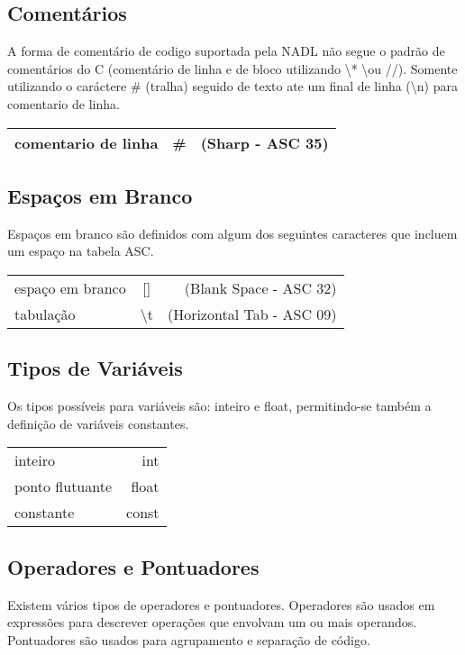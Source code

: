 \documentclass[a4paper,10pt]{article}
\begin{document}
	\subsection{Coment\'arios}
	A forma de coment\'ario de codigo suportada pela NADL n\~ao segue o padr\~ao de coment\'arios do C (coment\'ario de linha e de bloco utilizando \textbackslash * * \textbackslash  ou //). Somente utilizando o car\'actere \# (tralha) seguido de texto ate um final de linha (\textbackslash n) para comentario de linha.

	\begin{center}
	 \begin{tabular}{| l | c | r |}
	  \hline
	  comentario de linha & \# & (Sharp - ASC 35)\\
	  \hline
	 \end{tabular}
	\end{center}

	\subsection{Espa\c{c}os em Branco}
	Espa\c{c}os em branco s\~{a}o definidos com algum dos seguintes caracteres que incluem um espa\c{c}o na tabela ASC.
	\begin{center}
	 \begin{tabular}{| l | c | r |}
	  \hline
	  espa\c{c}o em branco & [] & (Blank Space - ASC 32) \\
	  tabula\c{c}\~{a}o & \textbackslash t & (Horizontal Tab - ASC 09) \\
	  \hline
	 \end{tabular}
	\end{center}

	\subsection{Tipos de Vari\'aveis}
	Os tipos poss\'iveis para vari\'aveis s\~ao: inteiro e float, permitindo-se tamb\'em a defini\c{c}\~ao de vari\'aveis constantes.
	\begin{center}
	 \begin{tabular}{| l | r |}
	  \hline
	  inteiro & int \\
	  ponto flutuante & float\\
	  constante & const \\
	  \hline
	 \end{tabular}
	\end{center}

	\subsection{Operadores e Pontuadores}
Existem v\'arios tipos de operadores e pontuadores. Operadores s\~ao usados em express\~oes para descrever opera\c{c}\~{o}es que envolvam um ou mais operandos. Pontuadores s\~{a}o usados para agrupamento e separa\c{c}\~{a}o de c\'{o}digo.
\end{document}
